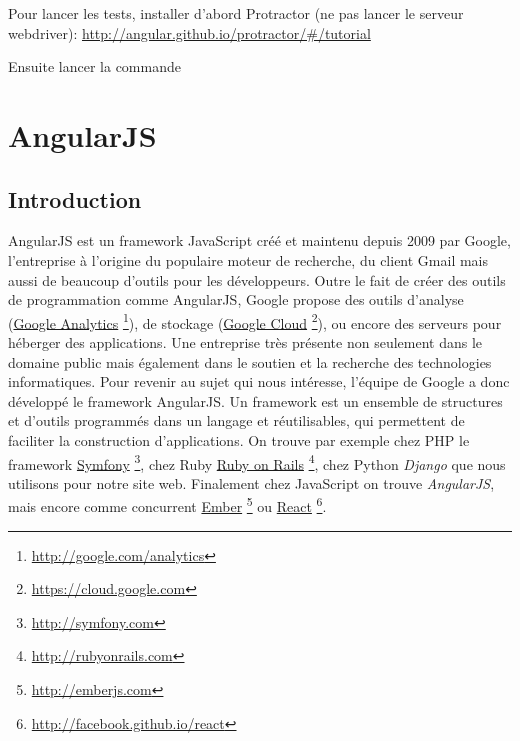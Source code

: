 \documentclass[letterpaper,10pt,oneside]{sphinxmanual}
\begin{document}
Pour lancer les tests, installer d'abord Protractor (ne pas lancer le serveur webdriver): \href{http://angular.github.io/protractor/\#/tutorial}{http://angular.github.io/protractor/\#/tutorial}

Ensuite lancer la commande 


\chapter{AngularJS}
\label{angularjs:angularjs}\label{angularjs::doc}

\section{Introduction}
\label{angularjs:introduction}
AngularJS est un framework JavaScript créé et maintenu depuis 2009 par Google, l'entreprise à l'origine du populaire moteur de recherche, du client Gmail mais aussi de beaucoup d'outils pour les développeurs. Outre le fait de créer des outils de programmation comme AngularJS, Google propose des outils d'analyse (\href{http://google.com/analytics}{Google Analytics} \footnote{
\href{http://google.com/analytics}{http://google.com/analytics}
}), de stockage (\href{https://cloud.google.com}{Google Cloud} \footnote{
\href{https://cloud.google.com}{https://cloud.google.com}
}), ou encore des serveurs pour héberger des applications. Une entreprise très présente non seulement dans le domaine public mais également dans le soutien et la recherche des technologies informatiques. Pour revenir au sujet qui nous intéresse, l'équipe de Google a donc développé le framework AngularJS. Un framework est un ensemble de structures et d'outils programmés dans un langage et réutilisables, qui permettent de faciliter la construction d'applications. On trouve par exemple chez PHP le framework \href{http://symfony.com}{Symfony} \footnote{
\href{http://symfony.com}{http://symfony.com}
}, chez Ruby \href{http://rubyonrails.com}{Ruby on Rails} \footnote{
\href{http://rubyonrails.com}{http://rubyonrails.com}
}, chez Python \emph{Django} que nous utilisons pour notre site web. Finalement chez JavaScript on trouve \emph{AngularJS}, mais encore comme concurrent \href{http://emberjs.com}{Ember} \footnote{
\href{http://emberjs.com}{http://emberjs.com}
} ou \href{http://facebook.github.io/react/}{React} \footnote{
\href{http://facebook.github.io/react}{http://facebook.github.io/react}
}.
\end{document}

